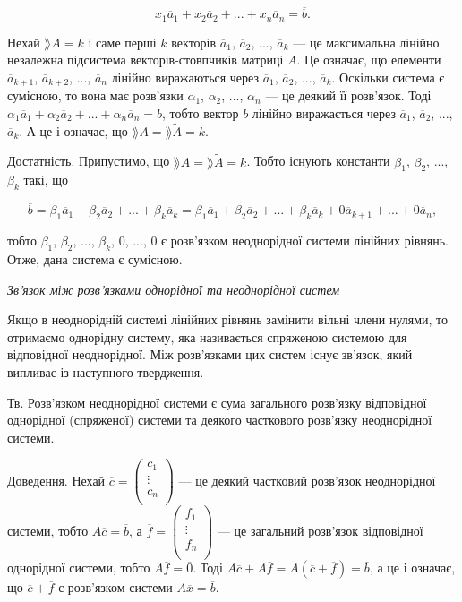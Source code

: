 $$x_1 \overline{a}_1 + x_2 \overline{a}_2 + ... + x_n \overline{a}_n = \overline{b}.$$

Нехай $\rang A = k$ і саме перші $k$ векторів $\overline{a}_1$, $\overline{a}_2$, ..., $\overline{a}_k$ ---
це максимальна лінійно незалежна підсистема векторів-стовпчиків матриці $A$. Це означає, що
елементи $\overline{a}_{k+1}$, $\overline{a}_{k+2}$, ..., $\overline{a}_{n}$ лінійно виражаються через 
$\overline{a}_1$, $\overline{a}_2$, ..., $\overline{a}_k$. Оскільки
система є сумісною, то вона має розв’язки $\alpha_1$, $\alpha_2$, ..., $\alpha_n$ --- це деякий її розв’язок.
Тоді $\alpha_1 \overline{a}_1 + \alpha_2 \overline{a}_2 + ... + \alpha_n \overline{a}_n = \overline{b}$,
тобто вектор $\overline{b}$ лінійно виражається через $\overline{a}_1$, $\overline{a}_2$, ..., $\overline{a}_k$.
А це і означає, що $\rang A = \rang \tilde{A} = k$.

Достатність. Припустимо, що $\rang A = \rang \tilde{A} = k$. Тобто існують константи
$\beta_1$, $\beta_2$, ..., $\beta_k$ такі, що

$$\overline{b} = \beta_1 \overline{a}_1 + \beta_2 \overline{a}_2 + ... + \beta_k \overline{a}_k
 = \beta_1 \overline{a}_1 + \beta_2 \overline{a}_2 + ... + \beta_k \overline{a}_k + 0 \overline{a}_{k+1} + ... + 0 \overline{a}_{n},$$

тобто $\beta_1$, $\beta_2$, ..., $\beta_k$, 0, ..., 0 є розв’язком неоднорідної системи лінійних рівнянь.
Отже, дана система є сумісною.


\textit{Зв’язок між розв’язками однорідної та неоднорідної систем}


Якщо в неоднорідній системі лінійних рівнянь замінити вільні члени нулями,
то отримаємо однорідну систему, яка називається спряженою системою для
відповідної неоднорідної. Між розв’язками цих систем існує зв’язок, який випливає
із наступного твердження.


Тв. Розв’язком неоднорідної системи є сума загального розв’язку відповідної
однорідної (спряженої) системи та деякого часткового розв’язку неоднорідної
системи. 


Доведення. Нехай $\overline{c} = \begin{pmatrix}
	c_1 \\
	\vdots \\
	c_n \\
\end{pmatrix}$ --- це деякий частковий розв’язок неоднорідної
системи, тобто $A \overline{c} = \overline{b}$, а $\overline{f} = \begin{pmatrix}
	f_1 \\
	\vdots \\
	f_n \\
\end{pmatrix}$ --- це загальний розв’язок відповідної однорідної
системи, тобто $A \overline{f} = \overline{0}$. Тоді $A \overline{c} + A \overline{f} = A(\overline{c} + \overline{f}) = \overline{b}$,
а це і означає, що $\overline{c} + \overline{f}$ є
розв’язком системи $A \overline{x} = \overline{b}$.


